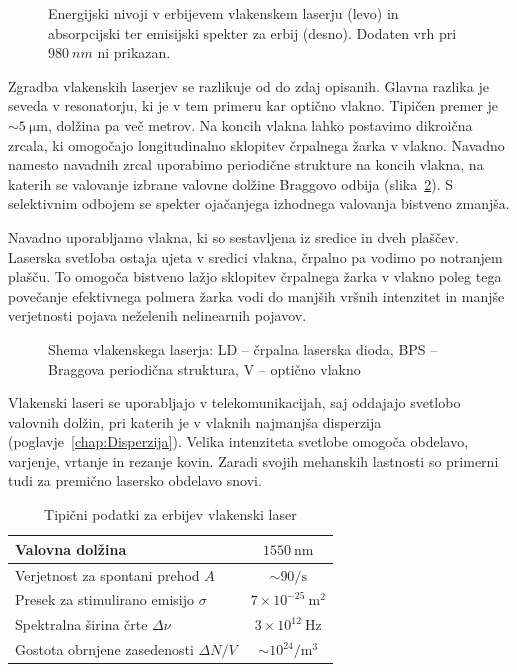 \begin{figure}[h]
\centering
\def\svgwidth{130truemm} 

\caption{Energijski nivoji v erbijevem vlakenskem laserju (levo) in 
absorpcijski ter emisijski spekter za erbij (desno). Dodaten vrh pri $980~\si{nm}$ 
ni prikazan.}
\label{fig:ErFib}
\end{figure} 

Zgradba vlakenskih laserjev se razlikuje od do zdaj opisanih. Glavna razlika je
seveda v resonatorju, ki je v tem primeru kar optično vlakno. Tipičen premer je 
$\sim 5~\si{\micro\meter}$, dolžina pa več metrov. Na koncih vlakna lahko 
postavimo dikroična zrcala, ki omogočajo longitudinalno sklopitev črpalnega 
žarka v vlakno. Navadno namesto navadnih zrcal uporabimo periodične strukture 
na koncih vlakna, na katerih se valovanje izbrane valovne dolžine Braggovo odbija
(slika~\ref{fig:Fibshema}). 
S selektivnim odbojem se spekter ojačanjega izhodnega valovanja bistveno zmanjša. 

Navadno uporabljamo vlakna, ki so sestavljena iz sredice in dveh plaščev. Laserska
svetloba ostaja ujeta v sredici vlakna, črpalno pa vodimo po notranjem plašču. To
omogoča bistveno lažjo sklopitev črpalnega žarka v vlakno poleg tega povečanje
efektivnega polmera žarka vodi do manjših vršnih intenzitet in manjše verjetnosti
pojava neželenih nelinearnih pojavov. 

\begin{figure}[h]
\centering
\def\svgwidth{100truemm} 

\caption{Shema vlakenskega laserja: LD -- črpalna laserska dioda, 
BPS -- Braggova periodična struktura, V -- optično vlakno
}
\label{fig:Fibshema}
\end{figure}

Vlakenski laseri se uporabljajo v telekomunikacijah, saj oddajajo svetlobo 
valovnih dolžin, pri katerih je v vlaknih najmanjša disperzija (poglavje~\ref{chap:Disperzija}). 
Velika intenziteta svetlobe omogoča obdelavo, varjenje, vrtanje in rezanje kovin. 
Zaradi svojih mehanskih lastnosti so primerni tudi za premično lasersko obdelavo snovi.

\begin{table}[!h]
\begin{center}
\begin{tabular}{|l|c|}\hline
Valovna dolžina  & $1550~\si{\nano\meter}$\\ \hline
Verjetnost za spontani prehod $A$ & $ \sim 90/\si{\second}$ \\ \hline
Presek za stimulirano emisijo $\sigma$ & $7 \times 10^{-25}~\si{\metre}^2$ \\ \hline
Spektralna širina črte $\Delta \nu$ & $3 \times 10^{12}~\si{\hertz}$  \\ \hline
Gostota obrnjene zasedenosti $\Delta N/V$ & $ \sim 10^{24}/\si{\metre}^3$ \\ \hline
\end{tabular}
\caption{Tipični podatki za erbijev vlakenski laser}
\label{tab:fib}
\end{center}
\end{table}

